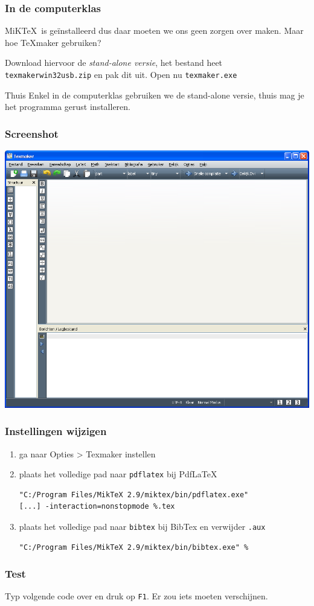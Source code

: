 \begin{frame}
  \frametitle{In de computerklas}

  MiK\TeX~is ge\"installeerd dus daar moeten we ons geen zorgen over maken. Maar hoe \TeX maker gebruiken?

  Download hiervoor de \emph{stand-alone versie}, het bestand heet \texttt{texmakerwin32usb.zip} en pak dit uit. Open nu \texttt{texmaker.exe}

  \pause
  \begin{exampleblock}{Thuis}
    Enkel in de computerklas gebruiken we de stand-alone versie, thuis mag je het programma gerust installeren.
  \end{exampleblock}
\end{frame}

\begin{frame}
  \frametitle{Screenshot}
  
  \includegraphics[scale=.2]{screenshot-1.png}
\end{frame}

\begin{frame}[fragile]
  \frametitle{Instellingen wijzigen}

  \begin{enumerate}
    \item ga naar Opties > Texmaker instellen
    \item plaats het volledige pad naar \texttt{pdflatex} bij PdfLaTeX
	  \begin{verbatim}
"C:/Program Files/MikTeX 2.9/miktex/bin/pdflatex.exe"
[...] -interaction=nonstopmode %.tex
	  \end{verbatim}
  \item plaats het volledige pad naar \texttt{bibtex} bij BibTex en verwijder \texttt{.aux}
	  \begin{verbatim}
"C:/Program Files/MikTeX 2.9/miktex/bin/bibtex.exe" %
	  \end{verbatim}
  \end{enumerate}
\end{frame}

\begin{frame}[fragile]
  \frametitle{Test}
  Typ volgende code over en druk op \texttt{F1}. Er zou iets moeten verschijnen.
  \inputminted{latex}{test-1.tex}
\end{frame}
